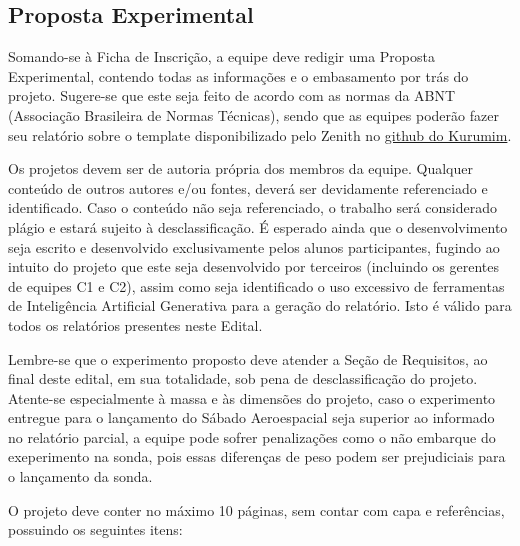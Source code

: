     \subsection{Proposta Experimental}
        Somando-se à Ficha de Inscrição, a equipe deve redigir uma Proposta Experimental, contendo todas as informações e o embasamento por trás do projeto. Sugere-se que este seja feito de acordo com as normas da ABNT (Associação Brasileira de Normas Técnicas), sendo que as equipes poderão fazer seu relatório sobre o template disponibilizado pelo Zenith no \href{https://github.com/zenitheesc/kurumim/tree/main/Relat%C3%B3rios}{\color{highcolor} github do Kurumim}.

        Os projetos devem ser de autoria própria dos membros da equipe. 
        Qualquer conteúdo de outros autores e/ou fontes, deverá ser devidamente referenciado e identificado. 
        Caso o conteúdo não seja referenciado, o trabalho será considerado plágio e estará sujeito à 
        desclassificação. É esperado ainda que o desenvolvimento seja escrito e desenvolvido exclusivamente 
        pelos alunos participantes, fugindo ao intuito do projeto que este seja desenvolvido por terceiros 
        (incluindo os gerentes de equipes C1 e C2), assim como seja identificado o uso excessivo de ferramentas
        de Inteligência Artificial Generativa para a geração do relatório. Isto é válido para todos os 
        relatórios presentes neste Edital.

        Lembre-se que o experimento proposto deve atender a Seção de Requisitos, ao final deste edital, 
        em sua totalidade, sob pena de desclassificação do projeto. Atente-se especialmente à massa e às 
        dimensões do projeto, caso o experimento entregue para o lançamento do Sábado Aeroespacial seja superior
        ao informado no relatório parcial, a equipe pode sofrer penalizações como o não embarque do exeperimento 
        na sonda, pois essas diferenças de peso podem ser prejudiciais para o lançamento da sonda.

        O projeto deve conter no máximo 10 páginas, sem contar com capa e referências, possuindo os seguintes itens:
        

